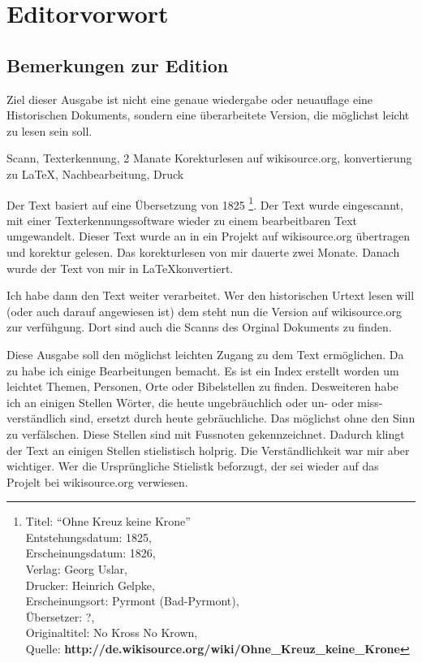 \part{Editorvorwort}


\chapter{Bemerkungen zur Edition}

Ziel dieser Ausgabe ist nicht eine genaue wiedergabe oder neuauflage eine
Historischen Dokuments, sondern eine überarbeitete Version, die möglichst
leicht zu lesen sein soll.

Scann, Texterkennung, 2 Manate Korekturlesen auf wikisource.org, konvertierung
zu LaTeX, Nachbearbeitung, Druck



Der Text basiert auf eine Übersetzung von 1825
\footnote{
Titel: "`Ohne Kreuz keine Krone"' \\
Entstehungsdatum: 1825, \\
Erscheinungsdatum: 1826, \\
Verlag: Georg Uslar, \\
Drucker: Heinrich Gelpke, \\
Erscheinungsort: Pyrmont (Bad-Pyrmont),\\
Übersetzer: ?, \\
Originaltitel: No Kross No Krown, \\
Quelle: \textbf{http://de.wikisource.org/wiki/Ohne\_Kreuz\_keine\_Krone}}. Der
Text wurde eingescannt, mit einer Texterkennungssoftware wieder zu einem
bearbeitbaren Text umgewandelt. Dieser Text wurde an in ein Projekt auf
wikisource.org übertragen und korektur gelesen. Das korekturlesen von mir
dauerte zwei Monate. Danach wurde der Text von mir in \LaTeX konvertiert.

Ich habe dann den Text weiter verarbeitet. Wer den historischen Urtext lesen
will (oder auch darauf angewiesen ist) dem steht nun die Version auf
wikisource.org zur verfühgung. Dort sind auch die Scanns des Orginal
Dokuments zu finden.

Diese Ausgabe soll den möglichst leichten Zugang zu dem Text ermöglichen. Da
zu habe ich einige Bearbeitungen bemacht. Es ist ein Index erstellt worden
um leichtet Themen, Personen, Orte oder Bibelstellen zu finden. Desweiteren
habe ich an einigen Stellen Wörter, die heute ungebräuchlich oder un- oder miss-
verständlich sind, ersetzt durch heute gebräuchliche. Das möglichst ohne den
Sinn zu verfälschen. Diese Stellen sind mit Fussnoten gekennzeichnet. Dadurch
klingt der Text an einigen Stellen stielistisch holprig. Die Verständlichkeit
war mir aber wichtiger. Wer die Ursprüngliche Stielistk beforzugt, der sei
wieder auf das Projelt bei wikisource.org verwiesen.

